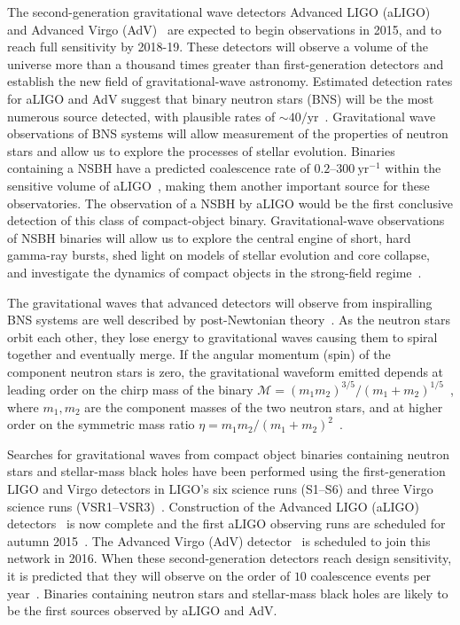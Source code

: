 
The second-generation gravitational wave detectors Advanced LIGO (aLIGO) and
Advanced Virgo (AdV)~\cite{Harry:2010zz, aVirgo} are expected to begin
observations in 2015, and to reach full sensitivity by 2018-19. These detectors
will observe a volume of the universe more than a thousand times greater than
first-generation detectors and establish the new field of gravitational-wave
astronomy. Estimated detection rates for aLIGO and AdV suggest that binary
neutron stars (BNS) will be the most numerous source detected, with plausible
rates of $\sim 40/\mathrm{yr}$~\cite{Abadie:2010cf}.
Gravitational wave
observations of BNS systems will allow measurement of the properties of
neutron stars and allow us to explore the processes of stellar evolution. 
Binaries containing a \ac{NSBH} have a predicted  
coalescence rate of $0.2$--$300\ \textrm{yr}^{-1}$ within the sensitive volume
of aLIGO~\cite{Abadie:2010cf}, making them another important source for these
observatories. The observation of a \ac{NSBH} by \ac{aLIGO} would be the first 
conclusive detection of this class of compact-object binary. Gravitational-wave observations of \ac{NSBH} binaries will allow us to explore the central engine of short,
hard gamma-ray bursts, shed light on models of stellar evolution and core
collapse, and investigate the dynamics of compact 
objects in the strong-field regime~\cite{lrr-2009-2, Eichler:1989ve, Narayan:1992iy, Paczynski:1991aq, Berger:2010qx, Fryer:2011cx, Hannam:2013uu}.

The gravitational waves that advanced detectors will observe from inspiralling BNS systems
are well described by post-Newtonian theory~\cite{Blanchet:2006zz}.
As the neutron stars orbit each other, they lose energy to gravitational waves
causing them to spiral together and eventually merge.
If the
angular momentum (spin) of the component neutron stars is zero, the gravitational
waveform emitted depends at leading order on the chirp mass of the binary
$\mathcal{M} = \left(m_1 m_2\right)^{3/5}/\left( m_1 +
m_2\right)^{1/5}$~\cite{Peters:1963ux}, where $m_1,m_2$ are the component masses
of the two neutron stars, and at higher order on the symmetric
mass ratio $\eta = m_1 m_2 /
(m_1+m_2)^2$~\cite{Blanchet:1995fg,Blanchet:1995ez,BIWW96,Wi93,BFIJ02,Blanchet:2004ek}.

Searches for gravitational waves from compact object
binaries containing neutron stars and stellar-mass black holes have been
performed using the first-generation LIGO and Virgo detectors in LIGO's six
science runs (S1--S6) and three Virgo science runs
(VSR1--VSR3)~\cite{Abbott:2003pj,Abbott:2005pe,Abbott:2005kq,Abbott:2007xi,Abbott:2007ai,Abbott:2009tt,Abbott:2009qj,Abadie:2010yba,Abadie:2011nz}.
Construction of the Advanced LIGO (aLIGO) detectors~\cite{TheLIGOScientific:2014jea} is now complete and the
first aLIGO observing runs are scheduled for autumn 2015~\cite{Aasi:2013wya}.
The Advanced Virgo (AdV) detector~\cite{Acernese:2015gua} is scheduled to join this network in 2016.
When these second-generation detectors reach design sensitivity, it is
predicted that they will observe on the order of $10$ coalescence events per
year~\cite{Abadie:2010cf}. Binaries containing neutron stars and stellar-mass
black holes are likely to be the first sources observed by aLIGO and AdV. 

